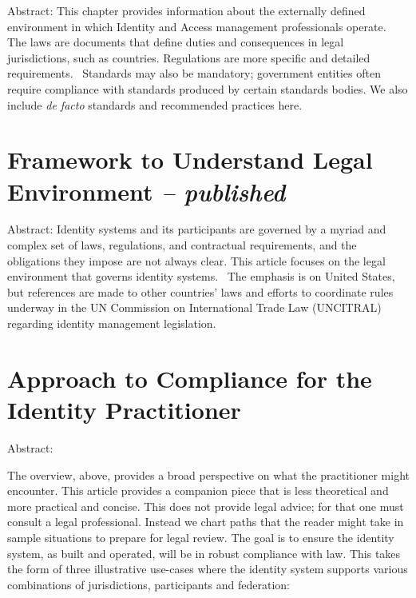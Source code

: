 Abstract: This chapter provides information about the externally defined
environment in which Identity and Access management professionals
operate.~ The laws are documents that define duties and consequences in
legal jurisdictions, such as countries. Regulations are more specific
and detailed requirements.~ Standards may also be mandatory; government
entities often require compliance with standards produced by certain
standards bodies. We also include \emph{de facto} standards and
recommended practices here.

\hypertarget{framework-to-understand-legal-environment-published}{%
\section{\texorpdfstring{Framework to Understand Legal Environment
\emph{--
published}}{Framework to Understand Legal Environment -- published}}\label{framework-to-understand-legal-environment-published}}

Abstract: Identity systems and its participants are governed by a myriad
and complex set of laws, regulations, and contractual requirements, and
the obligations they impose are not always clear. This article focuses
on the legal environment that governs identity systems.~ The emphasis is
on United States, but references are made to other countries' laws and
efforts to coordinate rules underway in the UN Commission on
International Trade Law (UNCITRAL) regarding identity management
legislation.

\hypertarget{approach-to-compliance-for-the-identity-practitioner}{%
\section{Approach to Compliance for the Identity
Practitioner}\label{approach-to-compliance-for-the-identity-practitioner}}

Abstract:

The overview, above, provides a broad perspective on what the
practitioner might encounter. This article provides a companion piece
that is less theoretical and more practical and concise. This does not
provide legal advice; for that one must consult a legal professional.
Instead we chart paths that the reader might take in sample situations
to prepare for legal review. The goal is to ensure the identity system,
as built and operated, will be in robust compliance with law. This takes
the form of three illustrative use-cases where the identity system
supports various combinations of jurisdictions, participants and
federation:

